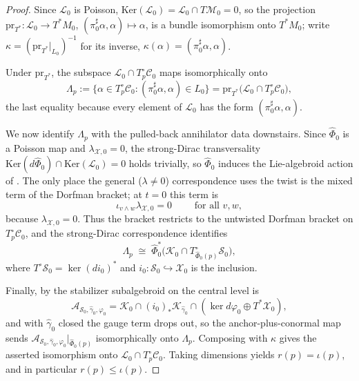 \documentclass[reqno]{amsart}
\theoremstyle{plain}
\theoremstyle{definition}
\newcommand{\C}{\mathcal{C}}
\renewcommand{\S}{\mathcal{S}}
\newcommand{\M}{\mathcal{M}}
\renewcommand{\L}{\mathcal{L}}
\newcommand{\Phib}{\widehat{\Phi}}
\newcommand{\X}{\mathcal{X}}
\newcommand{\gammab}{\widehat{\gamma}}
\newcommand{\A}{\mathcal{A}}
\newcommand{\Ker}{\text{Ker}}
\newcommand{\K}{\mathcal{K}}
\newcommand{\prTs}{\mathrm{pr}_{T^\ast}}
\begin{document}
\begin{proof}
Since $\L_0$ is Poisson, $\Ker(\L_0)= \L_0\cap T\M_0=0$, so the projection $\prTs: \L_0\to T^\ast M_0$, $(\pi_0^\sharp\alpha,\alpha)\mapsto\alpha$, is a
bundle isomorphism onto $T^\ast M_0$; write $\kappa=(\prTs|_{L_0})^{-1}$ for its
inverse, $\kappa(\alpha)=(\pi_0^\sharp\alpha,\alpha)$.
 
Under $\prTs$, the subspace $\L_0\cap T^{\circ}_{p}\C_0$ maps isomorphically onto
\[
  \Lambda_p:=\big\{\alpha\in T^{\circ}_{p}\C_0 :
   (\pi_0^\sharp\alpha,\alpha)\in L_0\big\}
   =\prTs\big(\L_0\cap T^{\circ}_{p}\C_0\big),
\]
the last equality because every element of $\L_0$ has the form
$(\pi_0^\sharp\alpha,\alpha)$.
 
We now identify $\Lambda_p$ with the pulled-back annihilator data downstairs. Since $\Phib_0$ is a Poisson map and $\lambda_{\X,0}=0$, the strong-Dirac transversality
$\Ker(d\Phib_0)\cap\Ker(\L_0)=0$ holds trivially, so $\Phib_0$ induces the Lie-algebroid action of \cite[Section 2]{bualibanu2026reduction}. The only place the general
($\lambda\neq0$) correspondence uses the twist is the mixed term of the Dorfman bracket; at $t=0$ this term is
\begin{equation}\label{eq:dorfman}
  \iota_{v\wedge w}\lambda_{\X,0}=0
  \qquad\text{ for all } v,w,
\end{equation}
because $\lambda_{\X,0}=0$. Thus the bracket restricts to the untwisted Dorfman bracket on $T^\circ_{p}\C_0$, and the strong-Dirac correspondence identifies
\[
  \Lambda_p \;\cong\; \Phib_0^\ast\big(\K_0\cap T^{\circ}_{\Phib_0(p)}\S_0\big),
\]
where $T^{\circ}\S_0=\ker(di_0)^\ast$ and $i_0\colon \S_0\hookrightarrow \X_0$ is the inclusion.
 
Finally, by \cite[Definition 2.2]{bualibanu2026reduction} the stabilizer subalgebroid on the central
level is
\[
  \A_{\S_0,\gammab_0,\varphi_0}
   =\K_0\cap (i_0)_{*} \K_{\gammab_0}\cap(\ker d\varphi_0\oplus T^\ast \X_0),
\]
and with $\gammab_0$ closed the gauge term drops out, so the anchor-plus-conormal map sends $\A_{\S_0,\gammab_0,\varphi_0}\big|_{\Phib_0(p)}$ isomorphically onto $\Lambda_p$. Composing with $\kappa$ gives the asserted isomorphism onto $\L_0\cap T^{\circ}_{p}\C_0$. Taking dimensions yields $r(p)=\iota(p)$, and in particular $r(p)\le\iota(p)$.
\end{proof}
\end{document}

